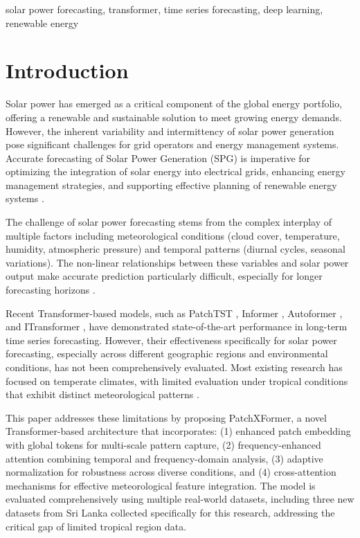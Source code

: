 \documentclass[conference]{IEEEtran}
\begin{document}
\begin{IEEEkeywords}
solar power forecasting, transformer, time series forecasting, deep learning, renewable energy
\end{IEEEkeywords}

\section{Introduction}

Solar power has emerged as a critical component of the global energy portfolio, offering a renewable and sustainable solution to meet growing energy demands. However, the inherent variability and intermittency of solar power generation pose significant challenges for grid operators and energy management systems. Accurate forecasting of Solar Power Generation (SPG) is imperative for optimizing the integration of solar energy into electrical grids, enhancing energy management strategies, and supporting effective planning of renewable energy systems \cite{ahmed2020review}.

The challenge of solar power forecasting stems from the complex interplay of multiple factors including meteorological conditions (cloud cover, temperature, humidity, atmospheric pressure) and temporal patterns (diurnal cycles, seasonal variations). The non-linear relationships between these variables and solar power output make accurate prediction particularly difficult, especially for longer forecasting horizons \cite{han2019review}.

Recent Transformer-based models, such as PatchTST \cite{nie2022patchtst}, Informer \cite{zhou2021informer}, Autoformer \cite{wu2021autoformer}, and ITransformer \cite{liu2023itransformer}, have demonstrated state-of-the-art performance in long-term time series forecasting. However, their effectiveness specifically for solar power forecasting, especially across different geographic regions and environmental conditions, has not been comprehensively evaluated. Most existing research has focused on temperate climates, with limited evaluation under tropical conditions that exhibit distinct meteorological patterns \cite{alali2023solar}.

This paper addresses these limitations by proposing PatchXFormer, a novel Transformer-based architecture that incorporates: (1) enhanced patch embedding with global tokens for multi-scale pattern capture, (2) frequency-enhanced attention combining temporal and frequency-domain analysis, (3) adaptive normalization for robustness across diverse conditions, and (4) cross-attention mechanisms for effective meteorological feature integration. The model is evaluated comprehensively using multiple real-world datasets, including three new datasets from Sri Lanka collected specifically for this research, addressing the critical gap of limited tropical region data.
\end{document}

